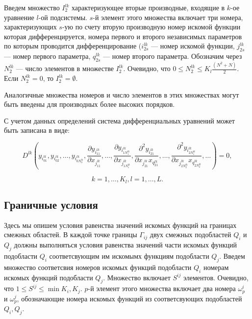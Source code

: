 \documentclass[a4paper,12pt]{article}
\begin{document}
  Введем множество $I_2^{lk}$ характеризующее вторые производные,
  входящие в $k$-ое уравнение $l$-ой подсистемы. $s$-й элемент этого
  множества включает три номера, характеризующих $s$-ую по счету
  вторую производную номер искомой функции которая дифференцируется,
  номера первого и второго независимых параметров по которым
  проводится дифференцирование ($i^{lk}_{2s}$ --- номер искомой
  функции, $j^{lk}_{2s}$ --- номер первого параметра, $q^{lk}_{2s}$
  --- номер второго параметра.  Обозначим через $N_{2}^{lk}$ --- число
  элементов в множестве $I_{2}^{lk}$. Очевидно, что $0 \le N_{2}^{lk}
  \le K_l \frac{(N^2+N)}{2}$.  Если $N_{2}^{lk} = 0$, то $I_{2}^{lk} =
  \emptyset$.

  Аналогичные множества номеров и число элементов в этих множествах
  могут быть введены для производных более высоких порядков.

  С учетом данных определений система дифференциальных уравнений может
  быть записана в виде:
  

  \begin{equation}
    \label{pdegen}
    D^{lk} (
    y_{i^{lk}_{01}}, y_{i^{lk}_{02}}, \ldots,y_{i^{lk}_{0N^{lk}_0}},
    \frac{\partial y_{i^{lk}_{11}}}{\partial x_{j^{lk}_{11}}},\ldots,
    \frac{\partial y_{i^{lk}_{1N^{lk}_1}}}{\partial x_{j^{lk}_{1N^{lk}_1}}},
    \frac{\partial^2 y_{i^{lk}_{21}}}{\partial x_{j^{lk}_{21}}x_{q^{lk}_{21}}},\ldots,
    \frac{\partial^2 y_{i^{lk}_{2N^{lk}_1}}}{\partial x_{j^{lk}_{2N^{lk}_2}}x_{q^{lk}_{2N^{lk}_2}}},
    \ldots) = 0,
  \end{equation}

  \begin{equation*}
    k = 1,\ldots,K_l,l = 1,\ldots,L.
  \end{equation*}  

  \subsection{Граничные условия}

  Здесь мы опишем условия равенства значений искомых функций на
  границах смежных областей.  В каждой точке границы $\Gamma_{ij}$
  двух смежных подобластей $Q_i$ и $Q_j$ должны выполняться условия
  равенства значений части искомых функций подобласти $Q_i$
  соответсвующим им искомымх функциям подобласти $Q_j$. Введем
  множество соответсвия номеров искомых функций подобласти $Q_i$
  номерам искомых функций подобласти $Q_j$. Множество включает
  $S^{ij}$ элементов. Очевидно, что $1 \le S^{ij} \le \min{K_i, K_j}$.
  $p$-й элемент этого множества включает два номера $\omega_p^i$ и
  $\omega_p^j$, обозначающие номера искомых функций из соответсвующих
  подобластей $Q_i,Q_j$.
\end{document}
